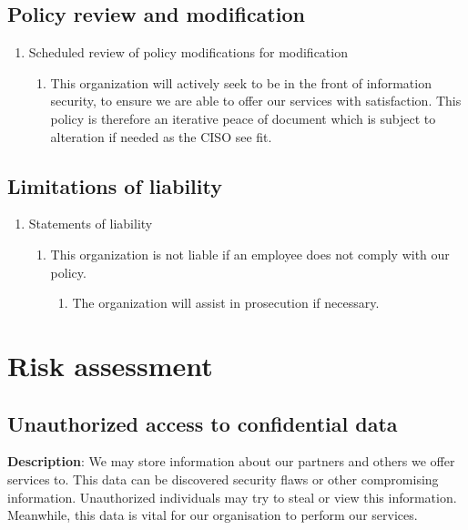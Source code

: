 \subsection{Policy review and modification}

\begin{enumerate}
  \item Scheduled review of policy modifications for modification
  \begin{enumerate}
    \item This organization will actively seek to be in the front of information security, to ensure we are able to offer our services with satisfaction. This policy is therefore an iterative peace of document which is subject to alteration if needed as the CISO see fit.
  \end{enumerate}
\end{enumerate}

\subsection{Limitations of liability}

\begin{enumerate}
  \item Statements of liability
  \begin{enumerate}
    \item This organization is not liable if an employee does not comply with our policy.
    \begin{enumerate}
      \item The organization will assist in prosecution if necessary.
    \end{enumerate}
  \end{enumerate}
\end{enumerate}


\section{Risk assessment}

\subsection{Unauthorized access to confidential data}

\textbf{Description}: We may store information about our partners and others we offer services to. This data can be discovered security flaws or other compromising information. Unauthorized individuals may try to steal or view this information. Meanwhile, this data is vital for our organisation to perform our services. 

